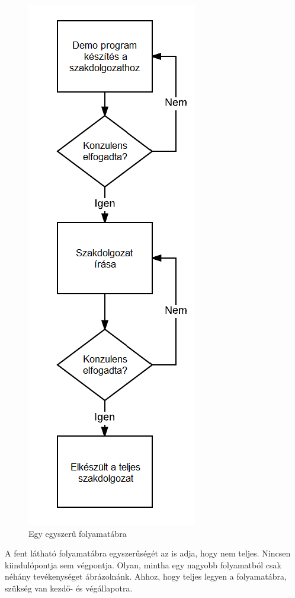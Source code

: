 \begin{figure}[h]
\centering
\includegraphics[scale=0.7]{images/folyamatabra.png}
\caption{Egy egyszerű folyamatábra}
\label{fig:folyamata}
\end{figure}

\newpage

A fent látható folyamatábra egyszerűségét az is adja, hogy nem teljes. Nincsen kiindulópontja sem végpontja. Olyan, mintha egy nagyobb folyamatból csak néhány tevékenységet ábrázolnánk. Ahhoz, hogy teljes legyen a folyamatábra, szükség van kezdő- és végállapotra.


